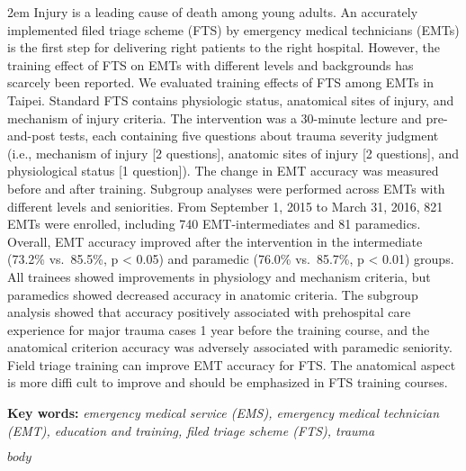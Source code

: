 \documentclass[
  20pt
]{article}
\begin{document}
\begin{minipage}{15cm}
    \vspace{5ex}
    



    {\parindent 2em Injury is a leading cause of death among young adults. An accurately
implemented filed triage scheme (FTS) by emergency medical technicians
(EMTs) is the first step for delivering right patients to the right
hospital. However, the training effect of FTS on EMTs with different
levels and backgrounds has scarcely been reported. We evaluated training
effects of FTS among EMTs in Taipei. Standard FTS contains physiologic
status, anatomical sites of injury, and mechanism of injury criteria.
The intervention was a 30-minute lecture and pre-and-post tests, each
containing five questions about trauma severity judgment (i.e.,
mechanism of injury {[}2 questions{]}, anatomic sites of injury {[}2
questions{]}, and physiological status {[}1 question{]}). The change in
EMT accuracy was measured before and after training. Subgroup analyses
were performed across EMTs with different levels and seniorities. From
September 1, 2015 to March 31, 2016, 821 EMTs were enrolled, including
740 EMT-intermediates and 81 paramedics. Overall, EMT accuracy improved
after the intervention in the intermediate (73.2\% vs.~85.5\%, p
\textless{} 0.05) and paramedic (76.0\% vs.~85.7\%, p \textless{} 0.01)
groups. All trainees showed improvements in physiology and mechanism
criteria, but paramedics showed decreased accuracy in anatomic criteria.
The subgroup analysis showed that accuracy positively associated with
prehospital care experience for major trauma cases 1 year before the
training course, and the anatomical criterion accuracy was adversely
associated with paramedic seniority. Field triage training can improve
EMT accuracy for FTS. The anatomical aspect is more diffi cult to
improve and should be emphasized in FTS training courses.}

    \vspace{1em}
    \textbf{Key words:} \textit{emergency medical service (EMS), emergency
medical technician (EMT), education and training, filed triage scheme
(FTS), trauma}

\end{minipage}

\vspace{2em}

\setlength{\parindent}{2em}


$body$

\end{document}
